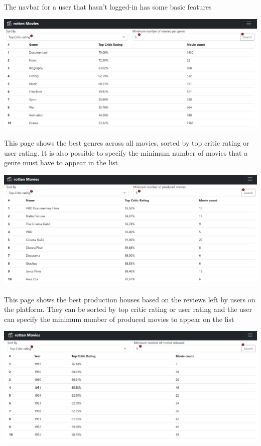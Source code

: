 The navbar for a user that hasn't logged-in has some basic features

\includegraphics[scale=0.45]{../../../images/user_manual/best_genres.png} 

This page shows the best genres across all movies, sorted by top critic rating or user rating. It is also possible to specify the minimum number of movies that a genre must have to appear in the list

\includegraphics[scale=0.45]{../../../images/user_manual/best_production_houses.png} 

This page shows the best production houses based on the reviews left by users on the platform. They can be sorted by top critic rating or user rating and the user can specify the minimum number of produced movies to appear on the list

\includegraphics[scale=0.45]{../../../images/user_manual/best_years.png} 

